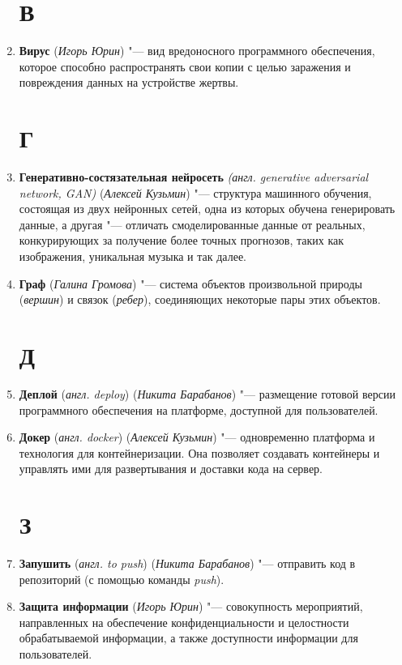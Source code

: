 \documentclass[14pt]{extarticle}
\begin{document}
\begin{enumerate}
    \section*{В}
    \item \textbf{Вирус} (\textit{Игорь Юрин}) "--- вид вредоносного программного обеспечения, которое способно
    распространять свои копии с целью заражения и повреждения данных на устройстве жертвы.
    \section*{Г}
    \item \textbf{Генеративно-состязательная нейросеть} \textit{(англ. generative adversarial network, GAN)} 
    (\textit{Алексей Кузьмин}) "--- структура машинного обучения, состоящая из двух нейронных сетей,
    одна из которых обучена генерировать данные, а другая "--- отличать смоделированные данные от реальных, конкурирующих за получение более точных прогнозов, таких как изображения, уникальная музыка и так далее.

    \item \textbf{Граф} (\textit{Галина Громова}) "--- система объектов произвольной природы (\textit{вершин}) и связок (\textit{ребер}), соединяющих некоторые пары этих объектов.
    
    \section*{Д}
    \item \textbf{Деплой} (\textit{англ. deploy}) (\textit{Никита Барабанов}) "--- размещение готовой версии программного обеспечения на платформе, доступной для пользователей.
    \item \textbf{Докер} (\textit{англ. docker}) (\textit{Алексей Кузьмин}) "--- одновременно платформа и технология для контейнеризации. Она позволяет создавать контейнеры и управлять ими для развертывания и доставки кода на сервер.
    \section*{З}
    \item \textbf{Запушить} (\textit{англ. to push}) (\textit{Никита Барабанов}) "--- отправить код в репозиторий (с помощью команды \textit{push}).
    \item \textbf{Защита информации} (\textit{Игорь Юрин}) "--- совокупность мероприятий, направленных на обеспечение конфиденциальности и целостности обрабатываемой информации, а также доступности информации для пользователей.

\end{enumerate}
\end{document}
